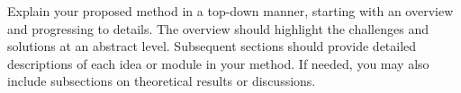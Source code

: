 Explain your proposed method in a top-down manner, starting with an overview and progressing to details. 
The overview should highlight the challenges and solutions at an abstract level. 
Subsequent sections should provide detailed descriptions of each idea or module in your method. 
If needed, you may also include subsections on theoretical results or discussions.
